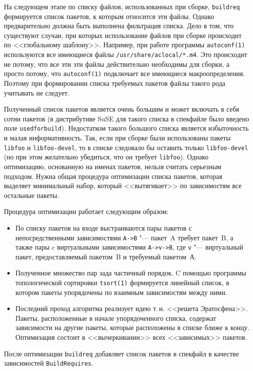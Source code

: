 \documentclass[russian,a4paper,12pt,titlepage]{article}
\begin{document}
На следующем этапе по списку файлов, использованных при сборке, \verb|buildreq| формируется список пакетов, к которым
относится эти файлы.  Однако предварительно должна быть выполнена фильтрация списка.  Дело в том, что существуют
случаи, при которых использование файлов при сборке происходит по <<глобальному шаблону>>.  Например, при работе
программы \verb|autoconf(1)| используются все имеющиеся файлы \verb|/usr/share/aclocal/*.m4|.  Это происходит не потому,
что все эти эти файлы действительно необходимы для сборки, а просто потому, что \verb|autoconf(1)| подключает все имеющиеся
макроопределения.  Поэтому при формировании списка требуемых пакетов файлы такого рода учитывать не следует.

Полученный список пакетов является очень большим и может включать в себя сотни пакетов (в дистрибутиве SuSE
для такого списка в спекфайле было введено поле \verb|usedforbuild|).  Недостатком такого большого списка
является избыточность и малая информативность.  Так, если при сборке были использованы пакеты \verb|libfoo|
и \verb|libfoo-devel|, то в списке следовало бы оставить только \verb|libfoo-devel| (но при этом желательно убедиться,
что он требует \verb|libfoo|).  Однако оптимизацию, основанную на именах пакетов, нельзя считать серьезным подходом.
Нужна общая процедура оптимизации списка пакетов, которая выделяет минимальный набор, который <<вытягивает>> по зависимостям
все остальные пакеты.

Процедура оптимизации работает следующим образом:
\begin{itemize}
\item По списку пакетов на входе выстраиваются пары пакетов с непосредственными
зависимостями \verb|A->B| "--- пакет~A требует пакет~B, а также пары c виртуальными зависимостями \verb|A->v->B|,
где \verb|v| "--- виртуальный пакет, предоставляемый пакетом~B и требуемый пакетом~А.
\item Полученное множество пар зада частичный порядок.  C помощью программы топологической
сортировки \verb|tsort(1)| формируется линейный список, в котором пакеты упорядочены по
взаимным зависимостям между ними.
\item Последний проход алгоритма реализует идею т.\,н. <<решета Эратосфена>>.
Пакеты, расположенные в начале упорядоченного списка, содержат зависимости
на другие пакеты, которые расположены в списке ближе к концу.  Оптимизация
состоит в <<вычеркивании>> всех <<зависимых>> пакетов.
\end{itemize}

После оптимизации \verb|buildreq| добавляет список пакетов в спекфайл в качестве зависимостей \verb|BuildRequires|.
\end{document}
